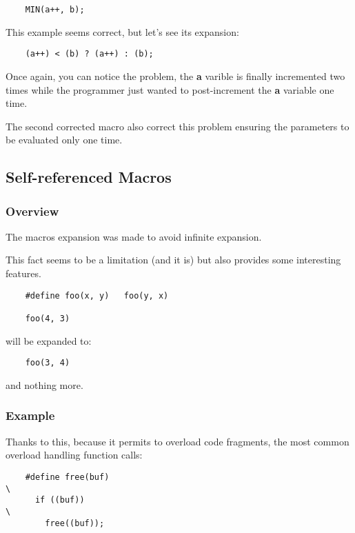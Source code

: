 {\begin{frame}[containsverbatim]
\begin{verbatim}
    MIN(a++, b);
  \end{verbatim}

  This example seems correct, but let's see its expansion:

  \begin{verbatim}
    (a++) < (b) ? (a++) : (b);
  \end{verbatim}

  Once again, you can notice the problem, the \textbf{a} varible is finally
  incremented two times while the programmer just wanted to post-increment
  the \textbf{a} variable one time.

  \nl

  The second corrected macro also correct this problem ensuring the parameters
  to be evaluated only one time.
\end{frame}

%
%

\subsection{Self-referenced Macros}


\begin{frame}[containsverbatim]
  \frametitle{Overview}

  The macros expansion was made to avoid infinite expansion.

  \nl

  This fact seems to be a limitation (and it is) but also provides
  some interesting features.

  \begin{verbatim}
    #define foo(x, y)   foo(y, x)

    foo(4, 3)
  \end{verbatim}

  will be expanded to:

  \begin{verbatim}
    foo(3, 4)
  \end{verbatim}

  and nothing more.
\end{frame}


\begin{frame}[containsverbatim]
  \frametitle{Example}

  Thanks to this, because it permits to overload code fragments, the most
  common overload handling function calls:

  \begin{verbatim}
    #define free(buf)                                                   \
      if ((buf))                                                        \
        free((buf));


\end{verbatim}
\end{frame}}
